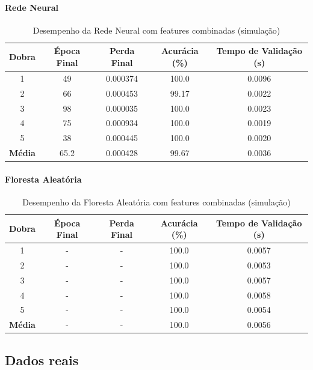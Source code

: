 \paragraph{Rede Neural}

\begin{table}[H]
\centering
\caption{Desempenho da Rede Neural com features combinadas (simulação)}
\label{tab:rn_features_lidar}
\begin{tabular}{ccccc}
\hline
\textbf{Dobra} & \textbf{Época Final} & \textbf{Perda Final} & \textbf{Acurácia (\%)} & \textbf{Tempo de Validação (s)} \\
\hline
1 & 49  & 0.000374 & 100.0  & 0.0096 \\
2 & 66  & 0.000453 & 99.17  & 0.0022 \\
3 & 98  & 0.000035 & 100.0  & 0.0023 \\
4 & 75  & 0.000934 & 100.0  & 0.0019 \\
5 & 38  & 0.000445 & 100.0  & 0.0020 \\
\hline
\textbf{Média} & 65.2 & 0.000428 & 99.67 & 0.0036 \\
\hline
\end{tabular}
\fonte{}
\end{table}

\paragraph{Floresta Aleatória}

\begin{table}[H]
\centering
\caption{Desempenho da Floresta Aleatória com features combinadas (simulação)}
\label{tab:floresta_features_lidar}
\begin{tabular}{ccccc}
\hline
\textbf{Dobra} & \textbf{Época Final} & \textbf{Perda Final} & \textbf{Acurácia (\%)} & \textbf{Tempo de Validação (s)} \\
\hline
1 & - & - & 100.0 & 0.0057 \\
2 & - & - & 100.0 & 0.0053 \\
3 & - & - & 100.0 & 0.0057 \\
4 & - & - & 100.0 & 0.0058 \\
5 & - & - & 100.0 & 0.0054 \\
\hline
\textbf{Média} & - & - & 100.0 & 0.0056 \\
\hline
\end{tabular}
\fonte{}
\end{table}

\subsection{Dados reais}

